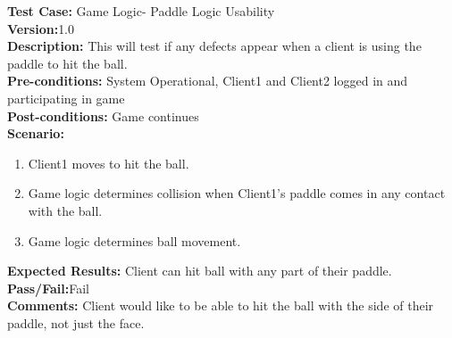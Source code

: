 \noindent \textbf{Test Case:} Game Logic- Paddle Logic Usability\\
\textbf{Version:}1.0\\
\textbf{Description:} This will test if any defects appear when a client is using the paddle to hit the ball.\\
\textbf{Pre-conditions:} System Operational, Client1 and Client2 logged in and participating in game \\
\textbf{Post-conditions:} Game continues\\
\textbf{Scenario:}
\begin{enumerate}
\item Client1 moves to hit the ball.\\
\item Game logic determines collision when Client1's paddle comes in any contact with the ball. \\
\item Game logic determines ball movement.\\
\end{enumerate}
\textbf{Expected Results:} Client can hit ball with any part of their paddle.\\
\textbf{Pass/Fail:}Fail\\
\textbf{Comments:} Client would like to be able to hit the ball with the side of their paddle, not just the face.\\

